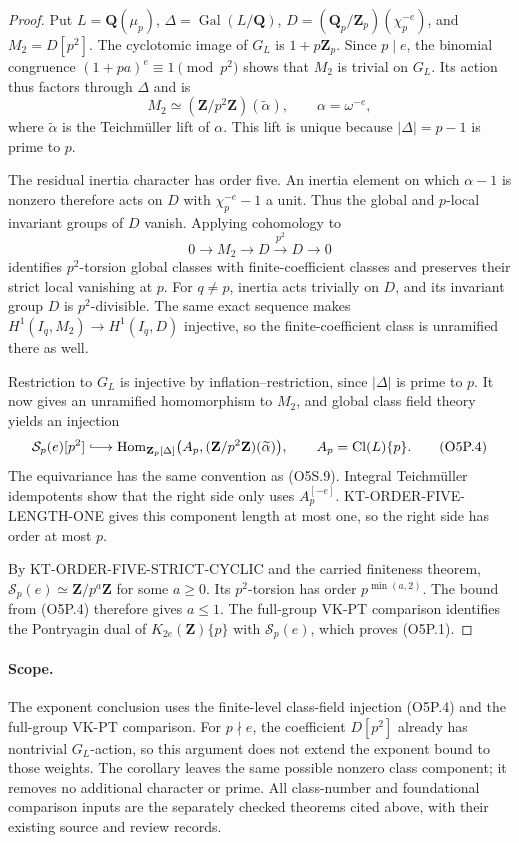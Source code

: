 \begin{proof}
Put $L=\mathbf Q(\mu_p)$, $\Delta=\operatorname{Gal}(L/\mathbf Q)$,
$D=(\mathbf Q_p/\mathbf Z_p)(\chi_p^{-e})$, and $M_2=D[p^2]$.
The cyclotomic image of $G_L$ is $1+p\mathbf Z_p$.
Since $p\mid e$, the binomial congruence
$(1+pa)^e\equiv1\pmod {p^2}$ shows that $M_2$ is trivial on
$G_L$.  Its action thus factors through $\Delta$ and is
\[
                M_2\simeq(\mathbf Z/p^2\mathbf Z)(\widetilde\alpha),
                \qquad\alpha=\omega^{-e},                \tag{O5P.2}
\]
where $\widetilde\alpha$ is the Teichm\"uller lift of $\alpha$.
This lift is unique because $|\Delta|=p-1$ is prime to $p$.

The residual inertia character has order five.  An inertia element
on which $\alpha-1$ is nonzero therefore acts on $D$ with
$\chi_p^{-e}-1$ a unit.  Thus the global and $p$-local invariant
groups of $D$ vanish.  Applying cohomology to
\[
 0\longrightarrow M_2\longrightarrow D
       \xrightarrow{\ p^2\ }D\longrightarrow0             \tag{O5P.3}
\]
identifies $p^2$-torsion global classes with finite-coefficient
classes and preserves their strict local vanishing at $p$.
For $q\ne p$, inertia acts trivially on $D$, and its invariant
group $D$ is $p^2$-divisible.  The same exact sequence makes
$H^1(I_q,M_2)\longrightarrow H^1(I_q,D)$ injective, so the
finite-coefficient class is unramified there as well.

Restriction to $G_L$ is injective by inflation--restriction,
since $|\Delta|$ is prime to $p$.
It now gives an unramified homomorphism to $M_2$, and global
class field theory yields an injection
\[
 \mathcal S_p(e)[p^2]\lhook\joinrel\longrightarrow
 \operatorname{Hom}_{\mathbf Z_p[\Delta]}
   \bigl(A_p, (\mathbf Z/p^2\mathbf Z)(\widetilde\alpha)\bigr),
 \qquad A_p=\operatorname{Cl}(L)\{p\}.                   \tag{O5P.4}
\]
The equivariance has the same convention as (O5S.9).
Integral Teichm\"uller idempotents show that the right side
only uses $A_p^{[-e]}$.  KT-ORDER-FIVE-LENGTH-ONE gives this
component length at most one, so the right side has order
at most $p$.

By KT-ORDER-FIVE-STRICT-CYCLIC and the carried finiteness theorem,
$\mathcal S_p(e)\simeq\mathbf Z/p^a\mathbf Z$ for some $a\ge0$.
Its $p^2$-torsion has order $p^{\min(a,2)}$.
The bound from (O5P.4) therefore gives $a\le1$.
The full-group VK-PT comparison identifies the Pontryagin dual
of $K_{2e}(\mathbf Z)\{p\}$ with $\mathcal S_p(e)$,
which proves (O5P.1).
\end{proof}

\paragraph{Scope.}
The exponent conclusion uses the finite-level class-field injection
(O5P.4) and the full-group VK-PT comparison.
For $p\nmid e$, the coefficient $D[p^2]$ already has nontrivial
$G_L$-action, so this argument does not extend the exponent bound
to those weights.  The corollary leaves the same possible nonzero
class component; it removes no additional character or prime.
All class-number and foundational comparison inputs are the
separately checked theorems cited above, with their existing
source and review records.
